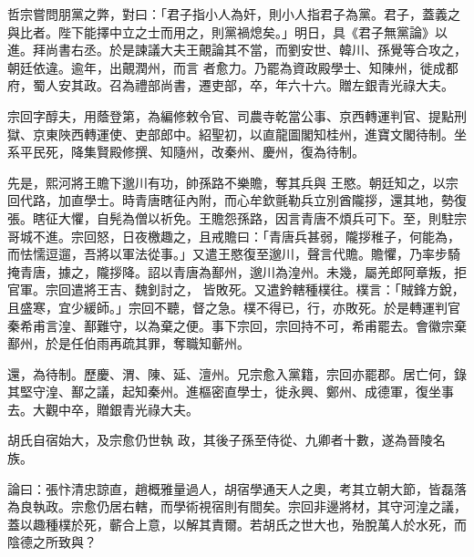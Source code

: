 \begin{pinyinscope}
 哲宗嘗問朋黨之弊，對曰：「君子指小人為奸，則小人指君子為黨。君子，蓋義之與比者。陛下能擇中立之士而用之，則黨禍熄矣。」明日，具《君子無黨論》以進。拜尚書右丞。於是諫議大夫王覿論其不當，而劉安世、韓川、孫覺等合攻之，朝廷依違。逾年，出覿潤州，而言
 者愈力。乃罷為資政殿學士、知陳州，徙成都府，蜀人安其政。召為禮部尚書，遷吏部，卒，年六十六。贈左銀青光祿大夫。



 宗回字醇夫，用蔭登第，為編修敕令官、司農寺乾當公事、京西轉運判官、提點刑獄、京東陜西轉運使、吏部郎中。紹聖初，以直龍圖閣知桂州，進寶文閣待制。坐系平民死，降集賢殿修撰、知隨州，改秦州、慶州，復為待制。



 先是，熙河將王贍下邈川有功，帥孫路不樂贍，奪其兵與
 王愍。朝廷知之，以宗回代路，加直學士。時青唐瞎征內附，而心牟欽氈勒兵立別酋隴拶，還其地，勢復張。瞎征大懼，自髡為僧以祈免。王贍怨孫路，因言青唐不煩兵可下。至，則駐宗哥城不進。宗回怒，日夜檄趣之，且戒贍曰：「青唐兵甚弱，隴拶稚子，何能為，而怯懦逗遛，吾將以軍法從事。」又遣王愍復至邈川，聲言代贍。贍懼，乃率步騎掩青唐，據之，隴拶降。詔以青唐為鄯州，邈川為湟州。未幾，屬羌郎阿章叛，拒官軍。宗回遣將王吉、魏釗討之，
 皆敗死。又遣鈐轄種樸往。樸言：「賊鋒方銳，且盛寒，宜少緩師。」宗回不聽，督之急。樸不得已，行，亦敗死。於是轉運判官秦希甫言湟、鄯難守，以為棄之便。事下宗回，宗回持不可，希甫罷去。會徽宗棄鄯州，於是任伯雨再疏其罪，奪職知蘄州。



 還，為待制。歷慶、渭、陳、延、澶州。兄宗愈入黨籍，宗回亦罷郡。居亡何，錄其堅守湟、鄯之議，起知秦州。進樞密直學士，徙永興、鄭州、成德軍，復坐事去。大觀中卒，贈銀青光祿大夫。



 胡氏自宿始大，及宗愈仍世執
 政，其後子孫至侍從、九卿者十數，遂為晉陵名族。



 論曰：張忭清忠諒直，趙概雅量過人，胡宿學通天人之奧，考其立朝大節，皆磊落為良執政。宗愈仍居右轄，而學術視宿則有間矣。宗回非邊將材，其守河湟之議，蓋以趣種樸於死，蘄合上意，以解其責爾。若胡氏之世大也，殆脫萬人於水死，而陰德之所致與？



\end{pinyinscope}